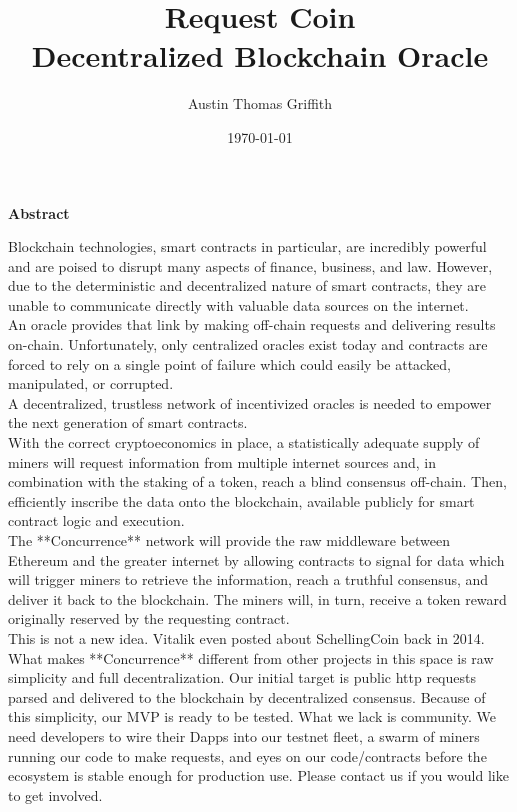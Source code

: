 \documentclass[a4paper,10pt]{article}
\begin{document}
\title{%
  Request Coin \\
  \medbreak
  \small  Decentralized Blockchain Oracle\\
     }

\date{\today}
\author{Austin Thomas Griffith}
\maketitle


\begin{center}
\textbf{Abstract}
\end{center}

Blockchain technologies, smart contracts in particular, are incredibly powerful and are poised to disrupt many aspects of finance, business, and law. However, due to the deterministic and decentralized nature of smart contracts, they are unable to communicate directly with valuable data sources on the internet.\\

An oracle provides that link by making off-chain requests and delivering results on-chain. Unfortunately, only centralized oracles exist today and contracts are forced to rely on a single point of failure which could easily be attacked, manipulated, or corrupted.\\

A decentralized, trustless network of incentivized oracles is needed to empower the next generation of smart contracts.\\

With the correct cryptoeconomics in place, a statistically adequate supply of miners will request information from multiple internet sources and, in combination with the staking of a token, reach a blind consensus off-chain. Then, efficiently inscribe the data onto the blockchain, available publicly for smart contract logic and execution.\\

The **Concurrence** network will provide the raw middleware between Ethereum and the greater internet by allowing contracts to signal for data which will trigger miners to retrieve the information, reach a truthful consensus, and deliver it back to the blockchain. The miners will, in turn, receive a token reward originally reserved by the requesting contract.\\

This is not a new idea. Vitalik even posted about SchellingCoin back in 2014. What makes **Concurrence** different from other projects in this space is raw simplicity and full decentralization. Our initial target is public http requests parsed and delivered to the blockchain by decentralized consensus. Because of this simplicity, our MVP is ready to be tested. What we lack is community. We need developers to wire their Dapps into our testnet fleet, a swarm of miners running our code to make requests, and eyes on our code/contracts before the ecosystem is stable enough for production use. Please contact us if you would like to get involved.\\
\end{document}
